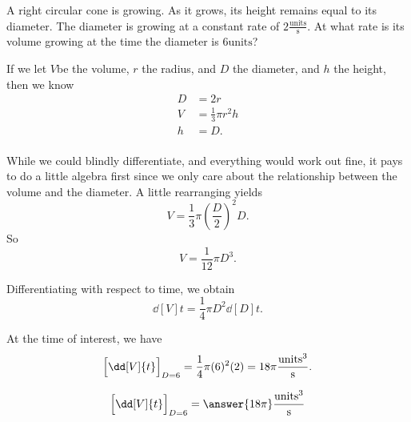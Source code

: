 \documentclass{ximera}
\author{Steven Gubkin\and Nela Lakos}
\begin{document}
\begin{exercise}

A right circular cone is growing.  As it grows, its height remains
equal to its diameter. The diameter is growing at a constant rate of
$2 \frac{\textrm{units}}{\textrm{s}}$. At what rate is its volume
growing at the time the diameter is $6 \textrm{units}$?


\begin{hint}
  If we let $V$be the volume, $r$ the radius, and $D$ the diameter,  and $h$ the height, then we know
\begin{align*}
	D &= 2r\\
	V &= \frac{1}{3} \pi r^2 h\\
	h &= D.\\
\end{align*}
\end{hint}
\begin{hint}

\end{hint}
\begin{hint}
  While we could blindly differentiate, and everything would work out
  fine, it pays to do a little algebra first since we only care about
  the relationship between the volume and the diameter.  A little
  rearranging yields
\[
V = \frac{1}{3} \pi \left(\frac{D}{2}\right)^2D.
\]
So
\[
V = \frac{1}{12} \pi D^3.
\]
\end{hint}

\begin{hint}
  Differentiating with respect to time, we obtain
  \[
  \dd[V]{t} = \frac{1}{4} \pi D^2 \dd[D]{t}.
  \]
\end{hint}

\begin{hint}
  At the time of interest, we have
  \[
 \Bigl[ \dd[V]{t} \Bigr]_{D=6}= \frac{1}{4} \pi (6)^2 (2) = 18\pi\frac{\textrm{units}^3}{\textrm{s}}.
  \]
\end{hint}

\begin{prompt}
  \[
 \Bigl[ \dd[V]{t} \Bigr]_{D=6} = \answer{18\pi}\frac{\textrm{units}^3}{\textrm{s}}
  \]
\end{prompt}

\end{exercise}
\end{document}
